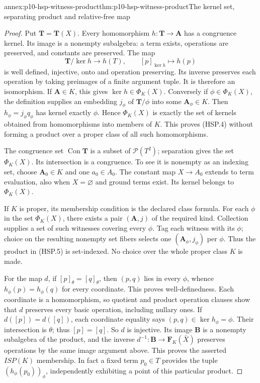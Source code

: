 \begin{annexitem}{annex:p10-hsp-witness-product}{thm:p10-hsp-witness-product}{The kernel set, separating product and relative-free map}
\begin{proof}
Put \(\mathbf T=\mathbf T(X)\).
Every homomorphism \(h:\mathbf T\to\mathbf A\)
has a congruence kernel. Its image is a nonempty
subalgebra: a term exists, operations are preserved,
and constants are preserved.
The map
\[
 \mathbf T/\ker h\longrightarrow h(T),\qquad
 [p]_{\ker h}\longmapsto h(p)
\]
is well defined, injective, onto and operation preserving.
Its inverse preserves each operation by taking preimages
of a finite argument tuple. It is therefore an isomorphism.
If \(\mathbf A\in K\), this gives
\(\ker h\in\Phi_K(X)\).
Conversely if \(\phi\in\Phi_K(X)\), the definition
supplies an embedding \(j_\phi\) of
\(\mathbf T/\phi\) into some \(\mathbf A_\phi\in K\).
Then \(h_\phi=j_\phi q_\phi\) has kernel exactly \(\phi\).
Hence \(\Phi_K(X)\) is exactly the set of kernels
obtained from homomorphisms into members of \(K\).
This proves (HSP.4) without forming a product over a
proper class of all such homomorphisms.

The congruence set \(\operatorname{Con}\mathbf T\)
is a subset of \(\mathcal P(T^2)\); separation gives
the set \(\Phi_K(X)\). Its intersection is a congruence.
To see it is nonempty as an indexing set, choose
\(\mathbf A_0\in K\) and one \(a_0\in A_0\).
The constant map \(X\to A_0\) extends to term evaluation,
also when \(X=\varnothing\) and ground terms exist.
Its kernel belongs to \(\Phi_K(X)\).

If \(K\) is proper, its membership condition is the
declared class formula. For each \(\phi\) in the set
\(\Phi_K(X)\), there exists a pair
\((\mathbf A,j)\) of the required kind.
Collection supplies a set of such witnesses covering
every \(\phi\). Tag each witness with its \(\phi\);
choice on the resulting nonempty set fibers selects
one \((\mathbf A_\phi,j_\phi)\) per \(\phi\).
Thus the product in (HSP.5) is set-indexed.
No choice over the whole proper class \(K\) is made.

For the map \(d\), if \([p]_\theta=[q]_\theta\),
then \((p,q)\) lies in every \(\phi\), whence
\(h_\phi(p)=h_\phi(q)\) for every coordinate.
This proves well-definedness. Each coordinate is a
homomorphism, so quotient and product operation clauses
show that \(d\) preserves every basic operation,
including nullary ones.
If \(d([p])=d([q])\), each coordinate equality says
\((p,q)\in\ker h_\phi=\phi\).
Their intersection is \(\theta\); thus \([p]=[q]\).
So \(d\) is injective. Its image \(\mathbf B\)
is a nonempty subalgebra of the product, and the
inverse \(d^{-1}:\mathbf B\to\mathbf F_K(\bar X)\)
preserves operations by the same image argument above.
This proves the asserted \(ISP(K)\) membership.
In fact a fixed term \(p_0\in T\) provides the tuple
\((h_\phi(p_0))_\phi\), independently exhibiting a
point of this particular product.


\end{proof}
\end{annexitem}
